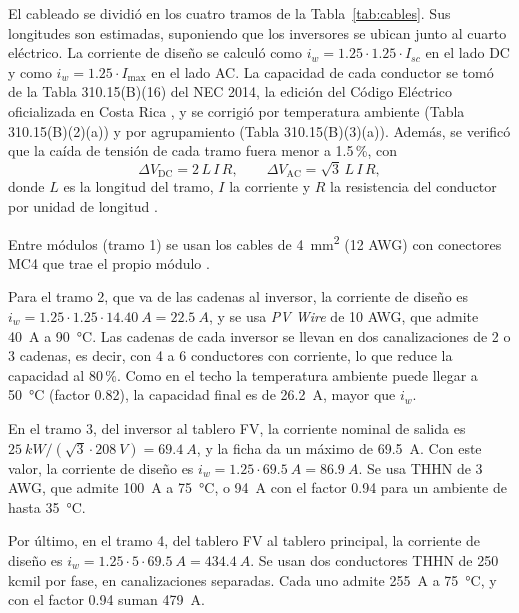 El cableado se dividió en los cuatro tramos de la Tabla~\ref{tab:cables}. Sus longitudes son estimadas, suponiendo que los inversores se ubican junto al cuarto eléctrico. La corriente de diseño se calculó como $i_w=1.25\cdot1.25\cdot I_{sc}$ en el lado DC y como $i_w=1.25\cdot I_{\max}$ en el lado AC. La capacidad de cada conductor se tomó de la Tabla 310.15(B)(16) del NEC 2014, la edición del Código Eléctrico oficializada en Costa Rica \cite{codigo_electrico, nec2014}, y se corrigió por temperatura ambiente (Tabla 310.15(B)(2)(a)) y por agrupamiento (Tabla 310.15(B)(3)(a)). Además, se verificó que la caída de tensión de cada tramo fuera menor a 1.5\,\%, con
\begin{equation}
\Delta V_{\mathrm{DC}} = 2\,L\,I\,R, \qquad \Delta V_{\mathrm{AC}} = \sqrt{3}\,L\,I\,R,
\end{equation}
donde $L$ es la longitud del tramo, $I$ la corriente y $R$ la resistencia del conductor por unidad de longitud \cite{nec2014}.

Entre módulos (tramo 1) se usan los cables de \SI{4}{mm^2} (12 AWG) con conectores MC4 que trae el propio módulo \cite{aiko_ds}.

Para el tramo 2, que va de las cadenas al inversor, la corriente de diseño es $i_w=1.25\cdot1.25\cdot\SI{14.40}{A}=\SI{22.5}{A}$, y se usa \textit{PV Wire} de 10 AWG, que admite \SI{40}{A} a \SI{90}{\celsius}. Las cadenas de cada inversor se llevan en dos canalizaciones de 2 o 3 cadenas, es decir, con 4 a 6 conductores con corriente, lo que reduce la capacidad al 80\,\%. Como en el techo la temperatura ambiente puede llegar a \SI{50}{\celsius} (factor 0.82), la capacidad final es de \SI{26.2}{A}, mayor que $i_w$.

En el tramo 3, del inversor al tablero FV, la corriente nominal de salida es $\SI{25}{kW}/(\sqrt{3}\cdot\SI{208}{V})=\SI{69.4}{A}$, y la ficha da un máximo de \SI{69.5}{A}. Con este valor, la corriente de diseño es $i_w=1.25\cdot\SI{69.5}{A}=\SI{86.9}{A}$. Se usa THHN de 3 AWG, que admite \SI{100}{A} a \SI{75}{\celsius}, o \SI{94}{A} con el factor 0.94 para un ambiente de hasta \SI{35}{\celsius}.

Por último, en el tramo 4, del tablero FV al tablero principal, la corriente de diseño es $i_w=1.25\cdot5\cdot\SI{69.5}{A}=\SI{434.4}{A}$. Se usan dos conductores THHN de 250 kcmil por fase, en canalizaciones separadas. Cada uno admite \SI{255}{A} a \SI{75}{\celsius}, y con el factor 0.94 suman \SI{479}{A}.

